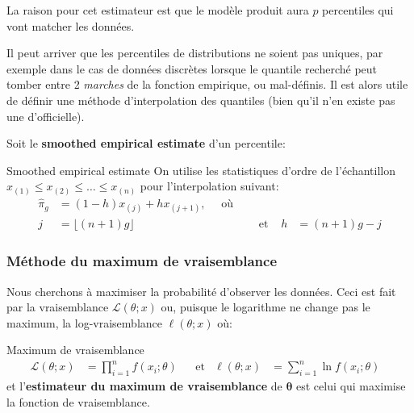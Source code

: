 \documentclass[10pt, french]{article}
\begin{document}
\begin{multicols*}{2}
La raison pour cet estimateur est que le modèle produit aura $p$ percentiles qui vont \guillemotleft matcher \guillemotright les données.

Il peut arriver que les percentiles de distributions ne soient pas uniques, par exemple dans le cas de données discrètes lorsque le quantile recherché peut tomber entre 2 \emph{marches} de la fonction empirique, ou mal-définis.
Il est alors utile de définir une méthode d'interpolation des quantiles (bien qu'il n'en existe pas une d'officielle).

Soit le \guillemotleft \textbf{smoothed empirical estimate} \guillemotright d'un percentile:

\begin{algo}{Smoothed empirical estimate}
On utilise les statistiques d'ordre de l'échantillon $x_{(1)} \le x_{(2)} \le \dots \le x_{(n)}$ pour l'interpolation suivant:
\begin{align*}
	\hat\pi_{g}
	&=	(1 - h)x_{(j)} + h x_{(j + 1)}, \quad \text{ où }	\\
	j
	&=	\lfloor (n + 1) g \rfloor	&
	&\text{ et }	&
	h
	&=	(n + 1) g - j
\end{align*}
\end{algo}


\subsubsection*{Méthode du maximum de vraisemblance}

Nous cherchons à maximiser la probabilité d'observer les données.
Ceci est fait par la vraisemblance $\mathcal{L}(\theta; x)$ ou, puisque le logarithme ne change pas le maximum, la log-vraisemblance $\ell(\theta; x)$ où:

\begin{algo}{Maximum de vraisemblance}
\begin{align*}
	\mathcal{L}(\theta; x)
	&=	\prod_{i = 1}^{n}	f(x_{i}; \theta)	&
	&\text{et}	&
	\ell(\theta; x)
	&=	\sum_{i = 1}^{n} \ln	f(x_{i}; \theta)	&
\end{align*}
et l'\textbf{estimateur du maximum de vraisemblance} de $\bm\theta$ est celui qui maximise la fonction de vraisemblance.
\end{algo}




\end{multicols*}
\end{document}

